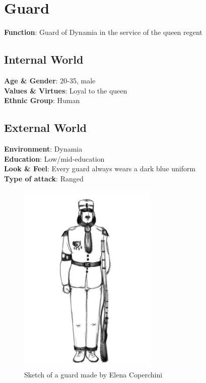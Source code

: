 \section{Guard}

\begin{minipage}{0.5\textwidth}
\textbf{Function}: Guard of Dynamia in the service of the queen regent

\subsection{Internal World}

\textbf{Age \& Gender}: 20-35, male \\
\textbf{Values \& Virtues}: Loyal to the queen\\
\textbf{Ethnic Group}: Human

\subsection{External World}
\textbf{Environment}: Dynamia \\
\textbf{Education}: Low/mid-education \\
\textbf{Look \& Feel}: Every guard always wears a dark blue uniform \\
\textbf{Type of attack}: Ranged \\
\end{minipage}%
%
\hfill\begin{minipage}{0.4\textwidth}
  \begin{figure}[H]
  \includegraphics{Images/Characters/guard_portrait}
  \caption{Sketch of a guard made by Elena Coperchini}
  \end{figure}
\end{minipage}


